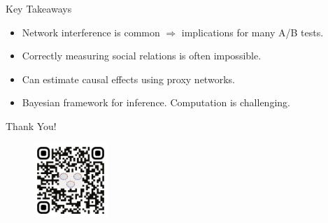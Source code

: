 \documentclass{beamer}
\begin{document}
    
    \begin{frame}{Key Takeaways}
        \large
        \begin{itemize}
            \item<1-> Network interference is common $\Rightarrow$ implications for many A/B tests.
            \vspace{0.3cm}
            \item<2-> Correctly measuring social relations is often impossible.
            \vspace{0.3cm}
            \item<2-> Can estimate causal effects using proxy networks.
            \vspace{0.3cm}
            \item<3-> Bayesian framework for inference. Computation is challenging.
        \end{itemize}
    \end{frame}

    
    \begin{frame}[focus]
        \Huge
        Thank You!
        \vspace{0.5cm}
        \begin{figure}[hbtp]
            \centering
            \includegraphics[width=0.25\textwidth]{figs/qr-code.png}
        \end{figure}
    \end{frame}
    
    \appendix
    
\end{document}
